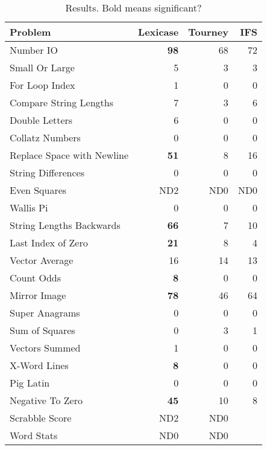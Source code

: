 \documentclass{sig-alternate}
\begin{document}
\begin{table}[t]
\centering
\caption{Results. Bold means significant?}
\label{tableResults}
\begin{tabular}{|l|rrr|}
\hline
Problem                    & Lexicase & Tourney & IFS \\
\hline
Number IO                  & \textbf{98}       & 68      & 72  \\
Small Or Large             & 5        & 3       & 3   \\
For Loop Index             & 1        & 0       & 0   \\
Compare String Lengths     & 7        & 3       & 6   \\
Double Letters             & 6        & 0       & 0   \\ %
Collatz Numbers            & 0        & 0       & 0   \\
Replace Space with Newline & \textbf{51}       & 8       & 16  \\
String Differences         & 0        & 0       & 0   \\
Even Squares               & ND2     & ND0     & ND0 \\
Wallis Pi                  & 0        & 0       & 0   \\
String Lengths Backwards   & \textbf{66}       & 7       & 10  \\
Last Index of Zero         & \textbf{21}       & 8       & 4   \\
Vector Average             & 16       & 14      & 13  \\
Count Odds                 & \textbf{8}        & 0       & 0   \\
Mirror Image               & \textbf{78}       & 46      & 64  \\
Super Anagrams             & 0        & 0       & 0   \\
Sum of Squares             & 0        & 3       & 1   \\
Vectors Summed             & 1        & 0       & 0   \\
X-Word Lines               & \textbf{8}        & 0       & 0   \\
Pig Latin                  & 0        & 0       & 0   \\
Negative To Zero           & \textbf{45}       & 10      & 8   \\
Scrabble Score             & ND2      & ND0     &     \\
Word Stats                 & ND0      & ND0     &     \\

\end{tabular}
\end{table}
\end{document}
